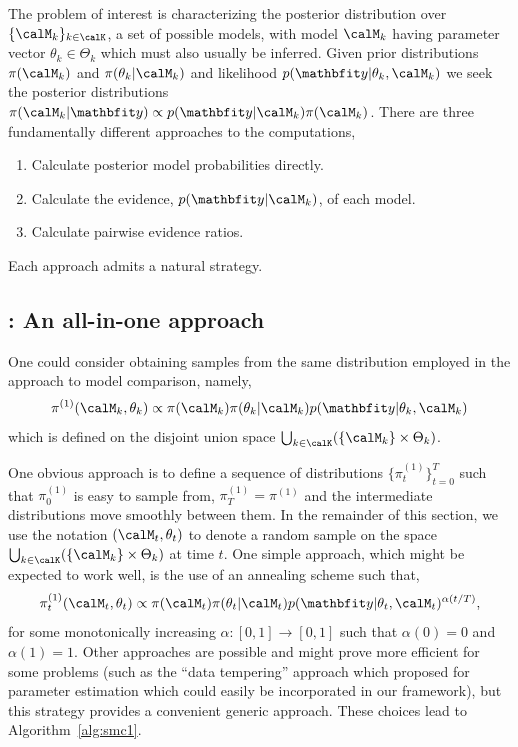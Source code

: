 The problem of interest is characterizing the posterior distribution over
$\{\calM_k\}_{k\in\calK}$, a set of possible models, with model $\calM_k$
having parameter vector $\theta_k\in\Theta_k$ which must also usually be
inferred. Given prior distributions $\pi(\calM_k)$ and $\pi(\theta_k|\calM_k)$
and likelihood $p(\data|\theta_k,\calM_k)$ we seek the posterior distributions
$\pi(\calM_k|\data) \propto p(\data|\calM_k)\pi(\calM_k)$. There are three
fundamentally different approaches to the computations,
\begin{enumerate}
  \item Calculate posterior model probabilities directly.
  \item Calculate the evidence, $p(\data|\calM_k)$, of each model.
  \item Calculate pairwise evidence ratios.
\end{enumerate}
Each approach admits a natural \smc strategy.

\subsection{\smc[1]: An all-in-one approach}
\label{sub:smc1: An all-in-one approach}

One could consider obtaining samples from the same distribution employed in
the \rjmcmc approach to model comparison, namely,
\begin{equation}
  \pi^{(1)}(\calM_k,\theta_k) \propto
  \pi(\calM_k)\pi(\theta_k|\calM_k)p(\data|\theta_k,\calM_k)
\end{equation}
which is defined on the disjoint union space
$\bigcup_{k\in\calK}(\{\calM_k\}\times\Theta_k)$.

One obvious \smc approach is to define a sequence of distributions
$\{\pi_t^{(1)}\}_{t=0}^T$ such that $\pi^{(1)}_0$ is easy to sample from,
$\pi_{T}^{(1)} = \pi^{(1)}$ and the intermediate distributions move smoothly
between them. In the remainder of this section, we use the notation
$(\calM_t,\theta_t)$ to denote a random sample on the space
$\bigcup_{k\in\calK}(\{\calM_k\}\times\Theta_k)$ at time $t$. One simple
approach, which might be expected to work well, is the use of an annealing
scheme such that,
\begin{equation}
  \pi^{(1)}_t(\calM_t,\theta_t) \propto \pi(\calM_t)\pi(\theta_t|\calM_t)
  p(\data|\theta_t,\calM_t)^{\alpha(t/T)},
  \label{eq:geometry_1}
\end{equation}
for some monotonically increasing $\alpha:[0,1]\to[0,1]$ such that $\alpha(0)
= 0$ and $\alpha(1) = 1$. Other approaches are possible and might prove more
efficient for some problems (such as the ``data tempering'' approach which
\cite{Chopin:2002hg} proposed for parameter estimation which could easily
be incorporated in our framework), but this strategy provides a convenient
generic approach. These choices lead to Algorithm~\ref{alg:smc1}.

